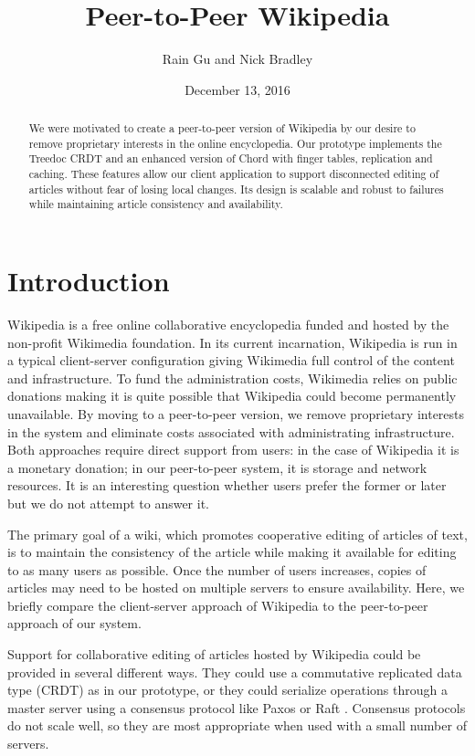 \documentclass[twocolumn]{article}
\title{Peer-to-Peer Wikipedia}
\author{Rain Gu and Nick Bradley}
\date{December 13, 2016}
\begin{document}
\maketitle

\begin{abstract}
We were motivated to create a peer-to-peer version of Wikipedia by our desire to remove proprietary interests in the online encyclopedia. Our prototype implements the Treedoc CRDT and an enhanced version of Chord with finger tables, replication and caching. These features allow our client application to support disconnected editing of articles without fear of losing local changes. Its design is scalable and robust to failures while maintaining article consistency and availability.
\end{abstract}

\section{Introduction}
Wikipedia is a free online collaborative encyclopedia funded and hosted by the non-profit Wikimedia foundation. In its current incarnation, Wikipedia is run in a typical client-server configuration giving Wikimedia full control of the content and infrastructure. To fund the administration costs, Wikimedia relies on public donations making it is quite possible that Wikipedia could become permanently unavailable. By moving to a peer-to-peer version, we remove proprietary interests in the system and eliminate costs associated with administrating infrastructure. Both approaches require direct support from users: in the case of Wikipedia it is a monetary donation; in our peer-to-peer system, it is storage and network resources. It is an interesting question whether users prefer the former or later but we do not attempt to answer it.

The primary goal of a wiki, which promotes cooperative editing of articles of text, is to maintain the consistency of the article while making it available for editing to as many users as possible. Once the number of users increases, copies of articles may need to be hosted on multiple servers to ensure availability. Here, we briefly compare the client-server approach of Wikipedia to the peer-to-peer approach of our system.

Support for collaborative editing of articles hosted by Wikipedia could be provided in several different ways. They could use a commutative replicated data type (CRDT) as in our prototype, or they could serialize operations through a master server using a consensus protocol like Paxos \cite{paxos} or Raft \cite{raft}. Consensus protocols do not scale well, so they are most appropriate when used with a small number of servers.
\end{document}
